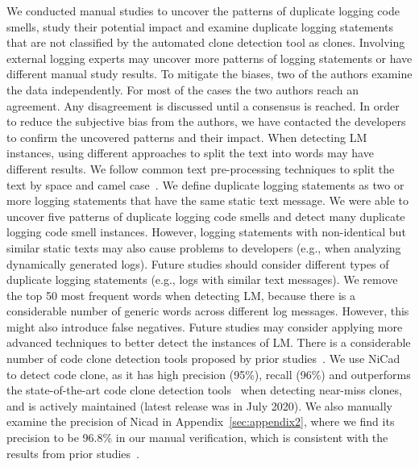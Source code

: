 We conducted manual studies to uncover the patterns of duplicate logging code smells, study their potential impact and examine duplicate logging statements that are not classified by the automated clone detection tool as clones. Involving external logging experts may uncover more patterns of logging statements or have different manual study results. To mitigate the biases, two of the authors examine the data independently. For most of the cases the two authors reach an agreement. Any disagreement is discussed until a consensus is reached. In order to reduce the subjective bias from the authors, we have contacted the developers to confirm the uncovered patterns and their impact.
When detecting LM instances, using different approaches to split the text into words may have different results. We follow common text pre-processing techniques to split the text by space and camel case~\cite{Chen:2016:SUT:2992358.2992444}.
We define duplicate logging statements as two or more logging statements that have the same static text message. We were able to uncover five patterns of duplicate logging code smells and detect many duplicate logging code smell instances. However, logging statements with non-identical but similar static texts may also cause problems to developers (e.g., when analyzing dynamically generated logs). Future studies should consider different types of duplicate logging statements (e.g., logs with similar text messages). 
We remove the top 50 most frequent words when detecting LM, because there is a considerable number of generic words across different log messages. However, this might also introduce false negatives. Future studies may consider applying more advanced techniques to better detect the instances of LM. 
There is a considerable number of code clone detection tools proposed by prior studies~\cite{kamiya2002,cpminer,DCCFINDER,duplix,nicad,gabel}. We use NiCad~\cite{nicad} to detect code clone, as it has high precision (95\%), recall (96\%) and outperforms the state-of-the-art code clone detection tools~\cite{nicad,NicadEvaluation,ROY2009470} when detecting near-miss clones, and is actively maintained (latest release was in July 2020). We also manually examine the precision of Nicad in Appendix~\ref{sec:appendix2}, where we find its precision to be 96.8\% in our manual verification, which is consistent with the results from prior studies~\cite{ROY2009470,NicadEvaluation}. 


